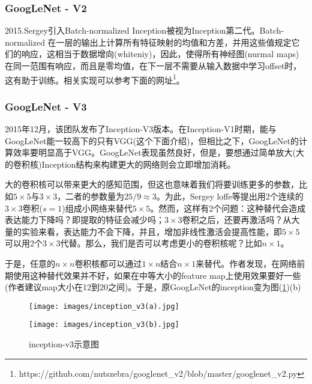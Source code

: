         \subsubsection{GoogLeNet - V2}
            \par
            2015.Sergey\cite{2015.Sergey}引入Batch-normalized Inception被视为Inception第二代。Batch-normalized 在一层的输出上计算所有特征映射的均值和方差，并用这些值规定它们的响应，这相当于数据增向(whiteniy)，因此，使得所有神经图(nurmal maps)在同一范围有响应，而且是零均值，在下一层不需要从输入数据中学习offset时，这有助于训练。相关实现可以参考下面的网址\footnote{https://github.com/nutszebra/googlenet\_v2/blob/master/googlenet\_v2.py}。

        \subsubsection{GoogLeNet - V3}
            \par
            2015年12月，该团队发布了Inception-V3版本\cite{2015.Szegedy}。在Inception-V1时期，能与GoogLeNet能一较高下的只有VGG(这个下面介绍)，但相比之下，GoogLeNet的计算效率要明显高于VGG。GoogLeNet表现虽然良好，但是，要想通过简单放大(大的卷积核)Inception结构来构建更大的网络则会立即增加消耗。
            \par
            大的卷积核可以带来更大的感知范围，但这也意味着我们将要训练更多的参数，比如$5\times 5$与$3\times 3$，二者的参数量为$25/9\approx 3$。为此，Sergey loffe等提出用2个连续的$3\times 3$卷积($s=1$)组成小网络来替代$5\times 5$。然而，这样有2个问题：这种替代会造成表达能力下降吗？即提取的特征会减少吗；$3\times 3$卷积之后，还要再激活吗？从大量的实验来看，表达能力不会下降，并且，增加非线性激活会提高性能，即$5\times 5$可以用2个$3\times 3$代替。那么，我们是否可以考虑更小的卷积核呢？比如$n\times 1$。
            \par
            于是，任意的$n\times n$卷积核都可以通过$1\times n$结合$n\times 1$来替代。作者发现，在网络前期使用这种替代效果并不好，如果在中等大小的feature map上使用效果要好一些(作者建议map大小在12到20之间)。于是，原GoogLeNet的inception变为图(\ref{fig:inception-v3示意图})(b)
            \begin{figure}[H]
              \centering
              \begin{varwidth}[t]{\textwidth}
                \vspace{0pt}
                \texttt{[image: images/inception\_v3(a).jpg]}
              \end{varwidth}
              \qquad\qquad
              \begin{varwidth}[t]{\textwidth}
                \vspace{0pt}
                \texttt{[image: images/inception\_v3(b).jpg]}
              \end{varwidth}
                        \caption{inception-v3示意图}
                        \label{fig:inception-v3示意图}
            \end{figure}
